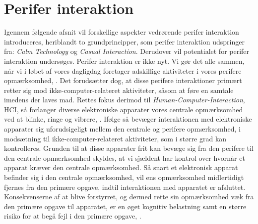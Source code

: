 \section{Perifer interaktion}
\label{PeriferInteratkion}
%
Igennem følgende afsnit vil forskellige aspekter vedrørende perifer interaktion introduceres, heriblandt to grundprincipper, som perifer interaktion udspringer fra: \textit{Calm Technology} og \textit{Casual Interaction}. Derudover vil potentialet for perifer interaktion undersøges.\blankline
%
Perifer interaktion er ikke nyt. Vi gør det alle sammen, når vi i løbet af vores dagligdag foretager adskillige aktiviteter i vores perifere opmærksomhed, \parencite[s. 1]{PDF:PIIntroduction}. Det forudsætter dog, at disse perifere interaktioner primært retter sig mod ikke-computer-relateret aktiviteter, såsom at føre en samtale imedens der laves mad. Rettes fokus derimod til \textit{Human-Computer-Interaction}, HCI, så forlanger diverse elektroniske apparater vores centrale opmærksomhed ved at blinke, ringe og vibrere, \parencite[s. 1]{PDF:PIIntroduction}. Ifølge \textcite[s. 3]{PDF:PIIntroduction} så bevæger interaktionen med elektroniske apparater sig uforudsigeligt mellem den centrale og perifere opmærksomhed, i modsætning til ikke-computer-relateret aktiviteter, som i større grad kan kontrolleres. Grunden til at disse apparater frit kan bevæge sig fra den perifere til den centrale opmærksomhed skyldes, at vi sjældent har kontrol over hvornår et apparat kræver den centrale opmærksomhed. Så snart et elektronisk apparat befinder sig i den centrale opmærksomhed, vil ens opmærksomhed midlertidigt fjernes fra den primære opgave, indtil interaktionen med apparatet er afsluttet. Konsekvenserne af at blive forstyrret, og dermed rette sin opmærksomhed væk fra den primære opgave til apparatet, er en øget kognitiv belastning samt en større risiko for at begå fejl i den primære opgave, \parencite[ss. 188-189][s. 162]{PDF:PIDesktopComputingKap9, PDF:ComparingInputModalities}. 

